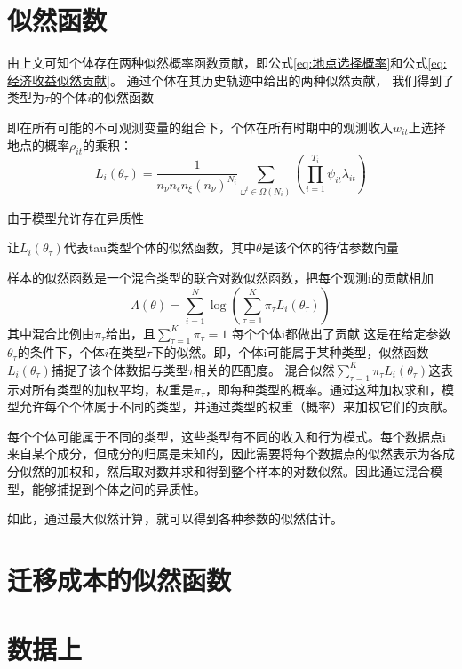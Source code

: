 \documentclass[a4paper,12pt,oneside, fontset=mac]{ctexbook} %
\begin{document}
\section{似然函数}


由上文可知个体存在两种似然概率函数贡献，即公式\ref{eq:地点选择概率}和公式\ref{eq:经济收益似然贡献}。
通过个体在其历史轨迹中给出的两种似然贡献，
我们得到了类型为$\tau$的个体$i$的似然函数

即在所有可能的不可观测变量的组合下，个体在所有时期中的观测收入$w_{it}$上选择地点的概率$\rho_{it}$的乘积：
\begin{equation}
  L_{i}(\theta_{\tau})=\frac{1}{n_{\nu}n_{\epsilon}n_{\xi}(n_{\nu})^{N_{i}}} \sum\limits_{\omega^{i}\in\Omega(N_{i})}(\prod\limits_{i=1}^{T_{i}} \psi_{it}\lambda_{it})
\end{equation}

由于模型允许存在异质性

让$L_{i}(\theta_{\tau})$代表tau类型个体的似然函数，其中$\theta$是该个体的待估参数向量

样本的似然函数是一个混合类型的联合对数似然函数，把每个观测i的贡献相加
\begin{equation}
\Lambda(\theta)=\sum\limits_{i=1}^{N}\log(\sum\limits_{\tau=1}^{K}\pi_{\tau}L_{i}(\theta_{\tau})) 
\end{equation}
其中混合比例由$\pi_{\tau}$给出，且$\sum\limits_{\tau=1}^{K}\pi_{\tau}=1$
每个个体i都做出了贡献
这是在给定参数$\theta_{\tau}$的条件下，个体$i$在类型$\tau$下的似然。即，个体i可能属于某种类型，似然函数
$L_i(\theta_{\tau})$捕捉了该个体数据与类型$\tau$相关的匹配度。
混合似然$\sum_{\tau=1}^{K} \pi_{\tau} L_i(\theta_{\tau})$这表示对所有类型的加权平均，权重是$\pi_{\tau}$，即每种类型的概率。通过这种加权求和，模型允许每个个体属于不同的类型，并通过类型的权重（概率）来加权它们的贡献。

每个个体可能属于不同的类型，这些类型有不同的收入和行为模式。每个数据点i来自某个成分，但成分的归属是未知的，因此需要将每个数据点的似然表示为各成分似然的加权和，然后取对数并求和得到整个样本的对数似然。因此通过混合模型，能够捕捉到个体之间的异质性。


如此，通过最大似然计算，就可以得到各种参数的似然估计。

\section{迁移成本的似然函数}




\section{数据上}
\end{document}
